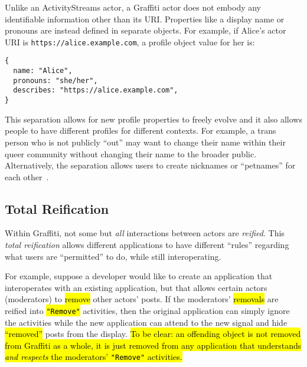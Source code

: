 Unlike an ActivityStreams actor, a Graffiti actor does not embody
any identifiable information other than its
URI.
Properties like a display name or pronouns are instead
defined in separate objects.
For example, if Alice's actor URI is
\texttt{https://\allowbreak{}alice.\allowbreak{}example.\allowbreak{}com}, a profile object value for her is:
\begin{verbatim}
{
  name: "Alice",
  pronouns: "she/her",
  describes: "https://alice.example.com",
}
\end{verbatim}

This separation allows for new profile
properties to freely evolve
and it also allows people to have different profiles for different contexts.
For example, a trans person who is not publicly ``out'' may want to
change their name within their queer community without
changing their name to the broader public.
Alternatively, the separation allows users to create nicknames
or ``petnames'' for each other~\cite{petnames}.


\subsection{Total Reification}
\label{concepts:total-reification}

Within Graffiti, not some but \emph{all} interactions between actors
are \emph{reified}.
This \emph{total reification} allows different applications to have
different ``rules'' regarding what users are ``permitted'' to do, while
still interoperating.

For example, suppose a developer would like to create an application
that interoperates with an existing application,
but that allows certain actors (moderators) to \hl{remove} other actors' posts.
If the moderators' \hl{removals} are reified into \hl{\texttt{"Remove"}} activities,
then the original application can simply ignore the activities
while the new application can attend to the new signal and hide \hl{``removed''} posts from the display.
\hl{%
To be clear: an offending object is not removed from Graffiti as a whole,
it is just removed from any application that understands \emph{and respects}
the moderators' \texttt{"Remove"} activities.%
}%

